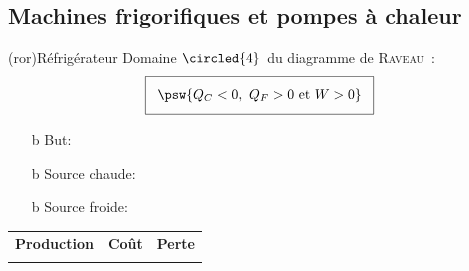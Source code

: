 \documentclass[../../main/main.tex]{subfiles}
\begin{document}
\subsection{Machines frigorifiques et pompes à chaleur}
\begin{tcb*}[sidebyside](ror){Réfrigérateur}
	Domaine $\circled{4}$ du diagramme de \textsc{Raveau}~:
	\begin{gather*}
		\setlength{\fboxsep}{3mm}
		\boxed{\psw{Q_C < 0,~Q_F > 0 \text{~et~} W > 0}}
	\end{gather*}
	\begin{itemize}
		\item[b]{But}: 
		\item[b]{\color{red}Source chaude}: 
		\item[b]{\color{blue}Source froide}: 
	\end{itemize}
	\begin{tabularx}{\linewidth}{YYY}
		\textbf{Production} &
		\textbf{Coût}       &
		\textbf{Perte}
		\\
		         &
		           &
	\end{tabularx}
	\tcblower
	\begin{center}
\end{center}
\end{tcb*}
\end{document}
